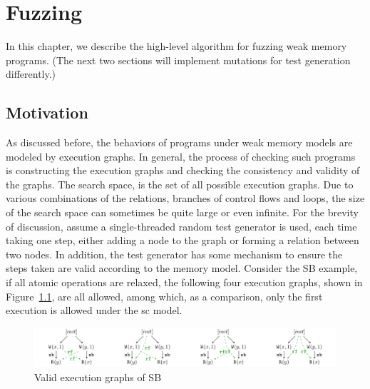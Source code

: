 \chapter{\label{cha:fuzz}Fuzzing}

In this chapter, we describe the high-level algorithm for fuzzing weak memory programs. (The next two sections will implement mutations for test generation differently.)

\section{Motivation}

As discussed before, the behaviors of programs under weak memory models are modeled by execution graphs. In general, the process of checking such programs is constructing the execution graphs and checking the consistency and validity of the graphs. The search space, is the set of all possible execution graphs. Due to various combinations of the relations, branches of control flows and loops, the size of the search space can sometimes be quite large or even infinite. For the brevity of discussion, assume a single-threaded random test generator is used, each time taking one step, either adding a node to the graph or forming a relation between two nodes. In addition, the test generator has some mechanism to ensure the steps taken are valid according to the memory model. Consider the SB example, if all atomic operations are relaxed, the following four execution graphs, shown in Figure~\ref{SB4}, are all allowed, among which, as a comparison, only the first execution is allowed under the sc model.

\begin{figure}[htbp] %
    \centering
    \includegraphics[scale=0.65]{figure/exec-graph/SB4.pdf} %
    \caption{Valid execution graphs of SB} %
    \label{SB4} %
\end{figure}





